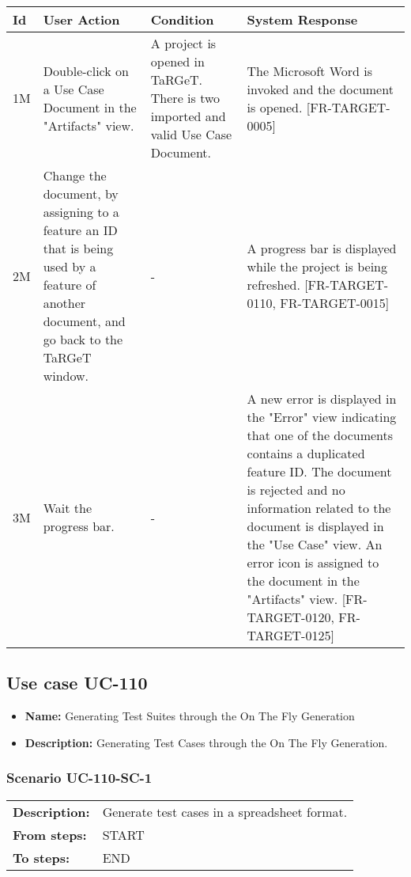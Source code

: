 \documentclass[a4paper,11pt]{article}
\newcommand{\bl}{\\ \hline}
\begin{document}
\begin{tabular}{|p{0.8in}|p{1.6in}|p{1.6in}|p{1.6in}|}
\hline
Id & User Action & Condition & System Response  \bl 
1M & Double-click on a Use Case Document in the "Artifacts" view. & A project is opened in TaRGeT. There is two imported and valid Use Case Document. & The Microsoft Word is invoked and the document is opened. [FR-TARGET-0005] \bl 
2M & Change the document, by assigning to a feature an ID that is being used by a feature of another document, and go back to the TaRGeT window. & - & A progress bar is displayed while the project is being refreshed. [FR-TARGET-0110, FR-TARGET-0015] \bl 
3M & Wait the progress bar. & - & A new error is displayed in the "Error" view indicating that one of the documents contains a duplicated feature ID. The document is rejected and no information related to the document is displayed in the "Use Case" view. An error icon is assigned to the document in the "Artifacts" view. [FR-TARGET-0120, FR-TARGET-0125] \bl 
\end{tabular}
\subsection*{Use case UC-110}
\begin{itemize}
\item {\bf Name: }Generating Test Suites through the On The Fly Generation
\item {\bf Description: }Generating Test Cases through the On The Fly Generation.
\end{itemize}
\subsubsection*{Scenario UC-110-SC-1}
\begin{tabular}{p{1in}p{4in}}
{\bf Description:} & Generate test cases in a spreadsheet format. \\
{\bf From steps:} & START \\
{\bf To steps:} & END \\
\end{tabular}
 
\end{document}
